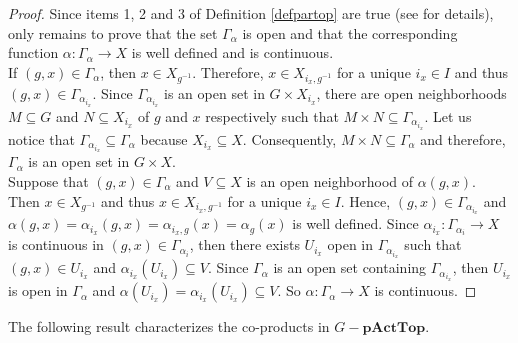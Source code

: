 \documentclass[sn-mathphys-num]{sn-jnl}%
\theoremstyle{thmstyleone}%
\theoremstyle{thmstyletwo}%
\theoremstyle{thmstylethree}%
\begin{document}
\begin{proof}
Since items 1, 2 and 3 of Definition \ref{defpartop} are true (see \cite{Avila1} for details), only remains to prove  that the set $\Gamma_{\alpha}$ is open and that the corresponding function $ \alpha: \Gamma_{\alpha} \to X $ is well defined and is continuous.\\

If $ (g, x) \in \Gamma_{\alpha}$, then $ x \in X_{g^{- 1}} $. Therefore, $ x \in X_{i_x, g^{- 1}} $ for a unique $ i_x \in I $ and thus $ (g, x) \in \Gamma_{\alpha_ {i_x}} $. Since $\Gamma_{\alpha_ {i_x}}$  is an open set in $ G \times X_ {i_x} $, there are open neighborhoods $M\subseteq G$ and $N\subseteq X_{i_x}$ of $g$ and $x$ respectively such that $M\times N\subseteq\Gamma_{\alpha_ {i_x}}$. Let us notice that $\Gamma_{\alpha_{i_x}} \subseteq \Gamma_\alpha $  because  $X_{i_x} \subseteq X$.  Consequently,  $M\times N \subseteq \Gamma_\alpha $ and therefore, $ \Gamma_{\alpha} $ is an open set in $ G \times X $.\\

Suppose that $ (g, x) \in \Gamma_ \alpha $ and $V\subseteq X$ is an open neighborhood of $\alpha(g,x)$. Then $ x \in X_ {g^{-1}} $ and thus $ x \in X_ {i_x, g^{-1}} $ for a unique $ i_x \in I $. Hence, $ (g, x) \in \Gamma_{\alpha_{i_x}} $ and 
$\alpha (g, x) = \alpha_{i_x}(g, x) =\alpha_{i_x, g}(x) =\alpha_ {g} (x) $
is well defined. Since $ \alpha_{{i_x}}: \Gamma_{\alpha_i} \to X $ is continuous in  $ (g, x) \in \Gamma_{\alpha_i} $, then there exists $U_{{i_x}}$ open in $\Gamma_{\alpha_{i_x}}$ such that  $(g,x)\in U_{{i_x}}$ and $\alpha_{i_x}(U_{{i_x}})\subseteq V$.  Since $\Gamma_\alpha$ is an open set containing $\Gamma_{\alpha_{i_x}}$, then  $U_{{i_x}}$ is  open in $\Gamma_{\alpha}$ and
$\alpha(U_{{i_x}})=\alpha_{i_x}(U_{{i_x}})\subseteq V$. So $ \alpha: \Gamma_{\alpha} \to X $ is continuous.
\end{proof}





The following result  characterizes the co-products in $G-\mathbf{pActTop}$.\\
\end{document}
